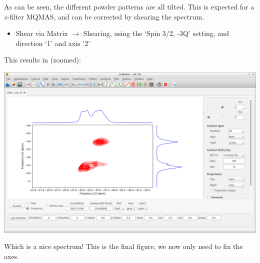 \documentclass[11pt,a4paper]{article}
\begin{document}
As can be seen, the different powder patterns are all tilted.
This is expected for a $z$-filter MQMAS, and can be corrected by shearing the spectrum.
\begin{itemize}
	\item Shear via Matrix $\longrightarrow$ Shearing, using the `Spin 3/2, -3Q' setting, and
	  direction `1' and axis '2'
\end{itemize}
This results in (zoomed):
\begin{center}
\includegraphics[width=0.8\linewidth]{Figs/Fig7.png}
\end{center}
Which is a nice spectrum! This is the final figure, we now only need to fix the axes.
\end{document}
